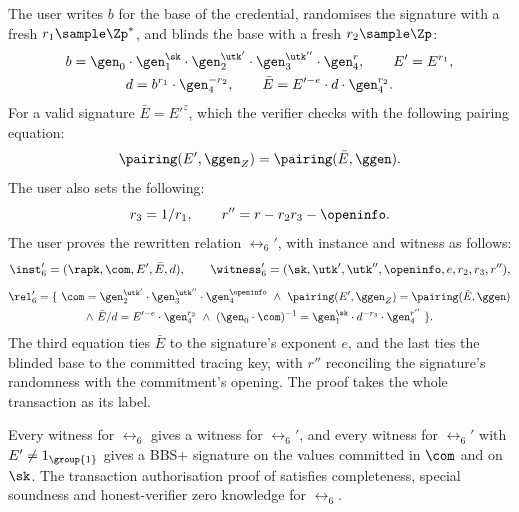 The user writes $b$ for the base of the credential, randomises the signature
with a fresh $r_1 \sample \Zp^*$, and blinds the base with a fresh $r_2 \sample
\Zp$:
%
\begin{gather*}
  b = \gen_0\cdot\gen_1^{\sk}\cdot\gen_2^{\utk'}\cdot\gen_3^{\utk''}\cdot
\gen_4^{r}, \qquad E' = E^{r_1}, \\ d = b^{r_1}\cdot\gen_4^{-r_2}, \qquad
\bar{E} = E'^{-e}\cdot d\cdot\gen_4^{r_2}.
\end{gather*}
%
For a valid signature $\bar{E} = E'^{z}$, which the verifier checks with the
following pairing equation:
%
\begin{equation*}
  \pairing(E',\ggen_Z) = \pairing(\bar{E},\ggen).
\end{equation*}
%
The user also sets the following:
%
\begin{equation*}
  r_3 = 1/r_1, \qquad r'' = r - r_2 r_3 - \openinfo.
\end{equation*}
%
The user proves the rewritten relation $\rel_6'$, with instance and witness as
follows:
%
\begin{equation*}
  \inst_6' = (\rapk, \com, E', \bar{E}, d), \qquad \witness_6' = (\sk, \utk',
\utk'', \openinfo, e, r_2, r_3, r''),
\end{equation*}
%
\begin{equation*} \begin{gathered}
  \rel_6' = \{\ \com = \gen_2^{\utk'}\cdot\gen_3^{\utk''}\cdot\gen_4^{\openinfo}\
\wedge \ \pairing(E', \ggen_Z) = \pairing(\bar{E}, \ggen) \\ \wedge \ \bar{E}/d
= E'^{-e}\cdot\gen_4^{r_2} \ \wedge \ (\gen_0\cdot\com)^{-1} =
\gen_1^{\sk}\cdot d^{-r_3}\cdot\gen_4^{r''}\ \}.
\end{gathered} \end{equation*}
%
The third equation ties $\bar{E}$ to the signature's exponent $e$, and the last
ties the blinded base to the committed tracing key, with $r''$ reconciling the
signature's randomness with the commitment's opening. The proof takes the whole
transaction as its label.

\begin{lemma}\label{lem:txid-rel6} Every witness for $\rel_6$ gives a witness
for $\rel_6'$, and every witness for $\rel_6'$ with $E' \neq 1_{\group{1}}$
gives a BBS+ signature on the values committed in $\com$ and on $\sk$. The
transaction authorisation proof of \Cref{prot:txid-tx-proof} satisfies
completeness, special soundness and honest-verifier zero knowledge for
$\rel_6$.
\end{lemma}

